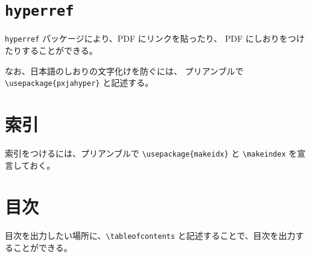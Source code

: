 \documentclass[ %
  uplatex,%
  a5paper,%
  papersize%
]{jsbook}
\begin{document}
\section{\texttt{hyperref}}
\texttt{hyperref} パッケージにより、PDF にリンクを貼ったり、
PDF にしおりをつけたりすることができる。

なお、日本語のしおりの文字化けを防ぐには、
プリアンブルで \verb|\usepackage{pxjahyper}| と記述する。

\section{索引}
索引をつけるには、プリアンブルで \verb|\usepackage{makeidx}| と
\verb|\makeindex| を宣言しておく。

\section{目次}

目次を出力したい場所に、\verb|\tableofcontents| と記述することで、目次を出力することができる。
\end{document}
